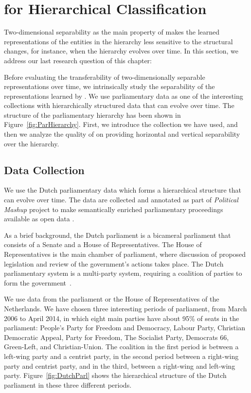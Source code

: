 \section{\achswlm for Hierarchical Classification}
Two-dimensional separability as the main property of \achswlm makes the learned representations of the entities in the hierarchy less sensitive to the structural changes, for instance, when the hierarchy evolves over time. In this section, we address our last research question of this chapter:

Before evaluating the transferability of two-dimensionally separable representations over time, we intrinsically study the separability of the representations learned by \achswlm. We use parliamentary data as one of the interesting collections with hierarchically structured data that can evolve over time. The structure of the parliamentary hierarchy has been shown in Figure~\ref{fig:ParHierarchy}.  First, we introduce the collection we have used, and then we analyze the quality of \achswlm on providing horizontal and vertical separability over the hierarchy. 

\subsection{Data Collection}
We use the Dutch parliamentary data which forms a hierarchical structure that can evolve over time. The data are collected and annotated as part of \emph{Political Mashup} project \citep{url:politicalmashup} to make semantically enriched parliamentary proceedings available as open data \citep{marx:2010}.

As a brief background, the Dutch parliament is a bicameral parliament that consists of a Senate and a House of Representatives. The House of Representatives is the main chamber of parliament, where discussion of proposed legislation and review of the government's actions takes place.  The Dutch parliamentary system is a multi-party system, requiring a coalition of parties to form the government~\citep{deswaan73}.


We use data from the parliament or the House of Representatives of the Netherlands.  We have chosen three interesting periods of parliament, from March 2006 to April 2014, in which eight main parties have about 95\% of seats in the parliament: People's Party for Freedom and Democracy, Labour Party, Christian Democratic Appeal, Party for Freedom, The Socialist Party, Democrats 66, Green-Left, and Christian-Union.   The coalition in the first period is between a left-wing party and a centrist party, in the second period between a right-wing party and centrist party, and in the third, between a right-wing and left-wing party. Figure~\ref{fig:DutchParl} shows the hierarchical structure of the Dutch parliament in these three different periods.

